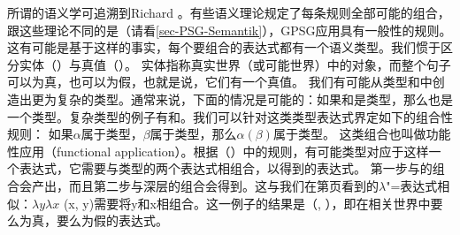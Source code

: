 所谓的语义学可追溯到Richard \citet{Montague74a-u}。有些语义理论规定了每条规则全部可能的组合，跟这些理论不同的是（请看\ref{sec-PSG-Semantik}），GPSG应用具有一般性的规则。
这有可能是基于这样的事实，每个要组合的表达式都有一个语义类型。我们惯于区分实体（）与真值（）。
实体指称真实世界（或可能世界）中的对象，而整个句子可以为真，也可以为假，也就是说，它们有一个真值。
我们有可能从类型和中创造出更为复杂的类型。通常来说，下面的情况是可能的：如果和是类型，那么也是一个类型。复杂类型的例子有和。我们可以针对这类类型表达式界定如下的组合性规则：
\ea
如果$\alpha$属于类型，$\beta$属于类型，那么$\alpha(\beta)$属于类型。
\z
\addlines[2]
这类组合也叫做功能性应用（functional application）。根据（）中的规则，有可能类型对应于这样一个表达式，它需要与类型的两个表达式相组合，以得到的表达式。
  第一步与的组合会产出，而且第二步与深层的组合会得到。这与我们在第\pageref{lambda-moegen}页看到的$\lambda$"=表达式相似：$\lambda y \lambda x$ (x, y)需要将y和x相组合。这一例子的结果是（, ），即在相关世界中要么为真，要么为假的表达式。
